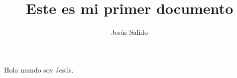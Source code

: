 \documentclass[11pt,a4paper,oneside]{article}
\author{Jesús Salido}
\title{Este es mi primer documento}
\begin{document}
\maketitle

Hola mundo soy Jesús.
\end{document}
